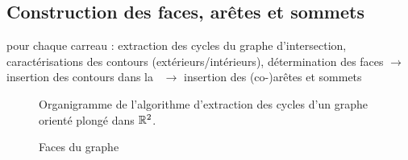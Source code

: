 \subsection{Construction des faces, arêtes et sommets \brep}
pour chaque carreau : extraction des cycles du graphe d'intersection, caractérisations des contours (extérieurs/intérieurs), détermination des faces $\to$ insertion des contours dans la \brep\ $\to$ insertion des (co-)arêtes et sommets
\begin{figure}
	\centering
	
	\caption{Organigramme de l'algorithme d'extraction des cycles d'un graphe orienté plongé dans $\mathbb{R}^2$.}
\end{figure}


\begin{figure}
	\centering
	
	\caption{Faces du graphe}
\end{figure}